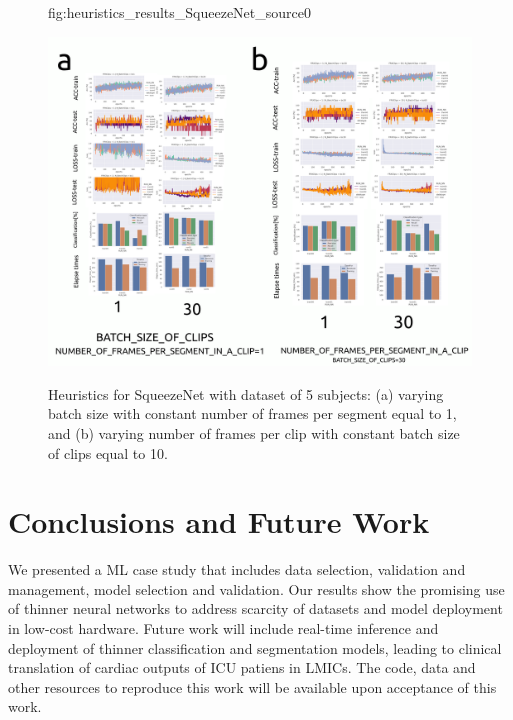 \documentclass[mlabstract,twocolumn]{jmlr}
\begin{document}
\begin{figure}[ht]%
\floatconts
  {fig:heuristics_results_SqueezeNet_source0}
  {
      \caption{
          Heuristics for SqueezeNet with dataset of 5 subjects: %
          (a) varying batch size with constant number of frames per segment equal to 1, and
          (b) varying number of frames per clip with constant batch size of clips equal to 10.
      }
  }
  {\includegraphics[width=0.81\linewidth]{../figures/heuristics_results_SqueezeNet_source0_with_05-31-subjects/versions/drawing-v03}}%
\end{figure}

\section{Conclusions and Future Work}
We presented a ML case study that includes data selection, validation and management, model selection and validation.
Our results show the promising use of thinner neural networks to address scarcity of datasets and model deployment in low-cost hardware.
Future work will include real-time inference and deployment of thinner classification and segmentation models, leading to clinical translation of cardiac outputs of ICU patiens in LMICs.
The code, data and other resources to reproduce this work will be available upon acceptance of this work.
\end{document}
